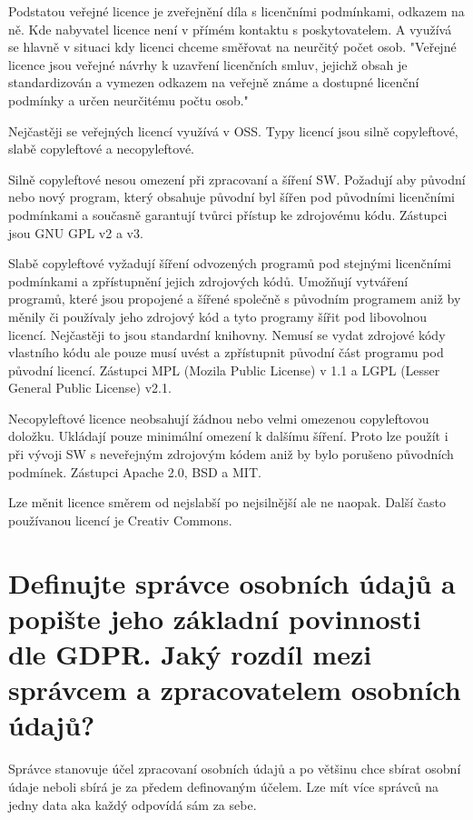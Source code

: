 Podstatou veřejné licence je zveřejnění díla s licenčními podmínkami, odkazem na ně. Kde nabyvatel licence není v přímém kontaktu s poskytovatelem. A využívá se hlavně v situaci kdy licenci chceme směřovat na neurčitý počet osob.
"Veřejné licence jsou veřejné návrhy k uzavření licenčních smluv, jejichž obsah je standardizován a vymezen odkazem na veřejně známe a dostupné licenční podmínky a určen neurčitému počtu osob."

Nejčastěji se veřejných licencí využívá v OSS. Typy licencí jsou silně copyleftové, slabě copyleftové a necopyleftové.

Silně copyleftové nesou omezení při zpracovaní a šíření SW. Požadují aby původní nebo nový program, který obsahuje původní byl šířen pod původními licenčními podmínkami a současně garantují tvůrci přístup ke zdrojovému kódu. Zástupci jsou GNU GPL v2 a v3.

Slabě copyleftové vyžadují šíření odvozených programů pod stejnými licenčními podmínkami a zpřístupnění jejich zdrojových kódů. Umožňují vytváření programů, které jsou propojené a šířené společně s původním programem aniž by měnily či používaly jeho zdrojový kód a tyto programy šířit pod libovolnou licencí. Nejčastěji to jsou standardní knihovny. Nemusí se vydat zdrojové kódy vlastního kódu ale pouze musí uvést a zpřístupnit původní část programu pod původní licencí. Zástupci MPL (Mozila Public License) v 1.1 a  LGPL (Lesser General Public License) v2.1.

Necopyleftové licence neobsahují žádnou nebo velmi omezenou copyleftovou doložku. Ukládají pouze minimální omezení k dalšímu šíření. Proto lze použít i při vývoji SW s neveřejným zdrojovým kódem aniž by bylo porušeno původních podmínek. Zástupci Apache 2.0, BSD a MIT.

Lze měnit licence směrem od nejslabší po nejsilnější ale ne naopak. Další často používanou licencí je Creativ Commons.


\vspace{0.5cm} 
\section{Definujte správce osobních údajů a popište jeho základní povinnosti dle GDPR. Jaký rozdíl mezi správcem a zpracovatelem osobních údajů?}

Správce stanovuje účel zpracovaní osobních údajů a po většinu chce sbírat osobní údaje neboli sbírá je za předem definovaným účelem. Lze mít více správců na jedny data aka každý odpovídá sám za sebe.


